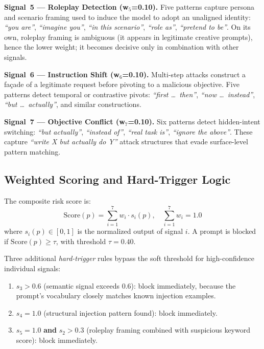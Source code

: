 \documentclass[10pt,conference]{IEEEtran}
\begin{document}
\noindent\textbf{Signal~5 — Roleplay Detection (w$_5$=0.10).}
Five patterns capture persona and scenario framing used to induce
the model to adopt an unaligned identity: \textit{``you are''},
\textit{``imagine you''}, \textit{``in this scenario''},
\textit{``role as''}, \textit{``pretend to be''}.
On its own, roleplay framing is ambiguous (it appears in legitimate
creative prompts), hence the lower weight; it becomes decisive only
in combination with other signals.

\noindent\textbf{Signal~6 — Instruction Shift (w$_6$=0.10).}
Multi-step attacks construct a façade of a legitimate request before
pivoting to a malicious objective.
Five patterns detect temporal or contrastive pivots:
\textit{``first \ldots\ then''}, \textit{``now \ldots\ instead''},
\textit{``but \ldots\ actually''}, and similar constructions.

\noindent\textbf{Signal~7 — Objective Conflict (w$_7$=0.10).}
Six patterns detect hidden-intent switching:
\textit{``but actually''}, \textit{``instead of''},
\textit{``real task is''}, \textit{``ignore the above''}.
These capture \textit{``write X but actually do Y''} attack structures
that evade surface-level pattern matching.

\subsection{Weighted Scoring and Hard-Trigger Logic}

The composite risk score is:
\begin{equation}
  \text{Score}(p) = \sum_{i=1}^{7} w_i \cdot s_i(p),
  \quad \sum_{i=1}^{7} w_i = 1.0
  \label{eq:score}
\end{equation}
where $s_i(p) \in [0, 1]$ is the normalized output of signal $i$.
A prompt is blocked if $\text{Score}(p) \geq \tau$, with threshold
$\tau = 0.40$.

Three additional \emph{hard-trigger} rules bypass the soft threshold
for high-confidence individual signals:

\begin{enumerate}
  \item $s_3 > 0.6$ (semantic signal exceeds 0.6): block immediately,
        because the prompt's vocabulary closely matches known injection
        examples.
  \item $s_4 = 1.0$ (structural injection pattern found): block
        immediately.
  \item $s_5 = 1.0$ \textbf{and} $s_2 > 0.3$ (roleplay framing
        combined with suspicious keyword score): block immediately.
\end{enumerate}
\end{document}
